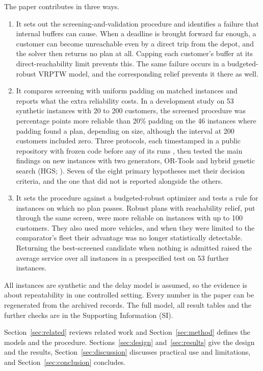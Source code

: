 \documentclass{itor}
\begin{document}
The paper contributes in three ways.
\begin{enumerate}
\item It sets out the screening-and-validation procedure and identifies a
failure that internal buffers can cause. When a deadline is brought forward far
enough, a customer can become unreachable even by a direct trip from the depot,
and the solver then returns no plan at all. Capping each customer's buffer at
its direct-reachability limit prevents this. The same failure occurs in a
budgeted-robust VRPTW model, and the corresponding relief prevents it there as
well.
\item It compares screening with uniform padding on matched instances and
reports what the extra reliability costs. In a development study on 53 synthetic
instances with 20 to 200 customers, the screened procedure was \ProcConsRange{}
percentage points more reliable than 20\% padding on the 46 instances where
padding found a plan, depending on size, although the interval at 200 customers
included zero. Three protocols, each timestamped
in a public repository with frozen code before any of its runs
\citep{ali2026freeze,ali2026freeze2,ali2026freeze3}, then tested the main
findings on new instances with two generators, OR-Tools \citep{ortools} and
hybrid genetic search (HGS; \citealp{vidal2022,wouda2024}). Seven of the eight
primary hypotheses met their decision criteria, and the one that did not is
reported alongside the others.
\item It sets the procedure against a budgeted-robust optimizer
\citep{bertsimas2004,agra2013} and tests a rule for instances on which no plan
passes. Robust plans with reachability relief, put through the same screen, were
more reliable on instances with up to 100 customers. They also used more
vehicles, and when they were limited to the comparator's fleet their advantage
was no longer statistically detectable. Returning the best-screened candidate when nothing
is admitted raised the average service over all instances in a prespecified
test on 53 further instances.
\end{enumerate}

All instances are synthetic and the delay model is assumed, so the evidence is
about repeatability in one controlled setting. Every number in the paper can be
regenerated from the archived records. The full model, all result tables and
the further checks are in the Supporting Information (SI).

Section~\ref{sec:related} reviews related work and Section~\ref{sec:method}
defines the models and the procedure. Sections~\ref{sec:design}
and~\ref{sec:results} give the design and the results,
Section~\ref{sec:discussion} discusses practical use and limitations, and
Section~\ref{sec:conclusion} concludes.
\end{document}
